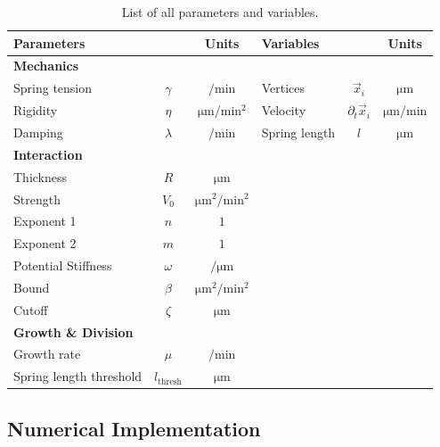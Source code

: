 \begin{table}[H]
    \centering
    \def\arraystretch{1.3}
    \begin{tabular}{l c c l c c}
        \textbf{Parameters} && \textbf{Units} & \textbf{Variables} && \textbf{Units}\\
        \toprule
        \multicolumn{4}{l}{\textbf{Mechanics}}\\
        \midrule
        Spring tension & $\gamma$ & $\unit{\per\minute}$ & Vertices & $\vec{x}_i$ & $\unit{\micro\metre}$\\
        Rigidity & $\eta$ & $\unit{\micro\metre\per\minute^2}$ & Velocity & $\partial_t\vec{x}_i$ & $\unit{\micro\metre\per\minute}$\\
        Damping & $\lambda$ & $\unit{\per\minute}$ & Spring length & $l$ & $\unit{\micro\metre}$\\
        \multicolumn{4}{l}{\textbf{Interaction}}\\
        \midrule
        Thickness & $R$ & $\unit{\micro\metre}$\\
        Strength & $V_0$ & $\unit{\micro\metre^2\per\minute^2}$\\
        Exponent 1 & $n$ & $1$\\
        Exponent 2 & $m$ & $1$\\
        Potential Stiffness & $\omega$ & $\unit{\per\micro\metre}$\\
        Bound & $\beta$ & $\unit{\micro\metre^2\per\minute^2}$\\
        Cutoff & $\zeta$ & $\unit{\micro\metre}$\\
        \multicolumn{4}{l}{\textbf{Growth \& Division}}\\
        \midrule
        Growth rate & $\mu$ &$\unit{\per\minute}$\\
        Spring length threshold & $l_\text{thresh}$ &$\unit{\micro\metre}$\\
        \bottomrule
    \end{tabular}
    \caption[List of all Parameters and Variables]{
        List of all parameters and variables.
    }
    \label{table:list-of-parameters}
\end{table}

\subsection{Numerical Implementation}


